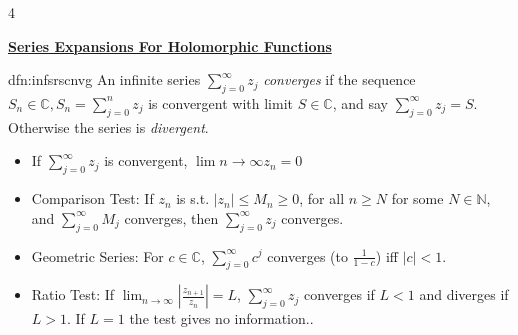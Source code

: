 \documentclass[landscape, 8pt]{extarticle}
\begin{document}
	\begin{multicols*}{4}
		\raggedcolumns 
	
	{\footnotesize \textbf{\underline{Series Expansions For Holomorphic Functions}}}
		
		
		\begin{dfn}{dfn:infsrscnvg}{ }
			An infinite series $\sum_{j=0}^{\infty}z_j$ \textit{converges} if the sequence $S_n \in \mathbb{C}, S_n = \sum_{j =0}^{n}z_j$ is convergent with limit $S \in \mathbb{C}$, and say $\sum_{j=0}^{\infty}z_j = S$. Otherwise the series is \textit{divergent}.
			\begin{itemize}
				\item If $\sum_{j=0}^{\infty}z_j$ is convergent, $\lim{n\to \infty} z_n = 0$
				\item Comparison Test: If $z_n$ is s.t. $\left|z_n\right| \le M_n \ge 0$, for all $n \ge N$ for some $N \in \mathbb{N}$, and $\sum_{j = 0}^{\infty} M_j$ converges, then $\sum_{j=0}^{\infty}z_j$ converges.
				\item Geometric Series: For $c \in \mathbb{C}$, $\sum_{j=0}^{\infty}c^j$ converges (to $\frac{1}{1-c}$) iff $\left|c\right| < 1$.
				\item Ratio Test: If $\lim_{n\to \infty} \left|\frac{z_{n+1}}{z_n}\right| = L$, $\sum_{j=0}^{\infty}z_j$ converges if $L < 1$ and diverges if $L > 1$. If $L = 1$ the test gives no information..
			\end{itemize}
			
		\end{dfn}
		

\end{multicols*}
\end{document}
